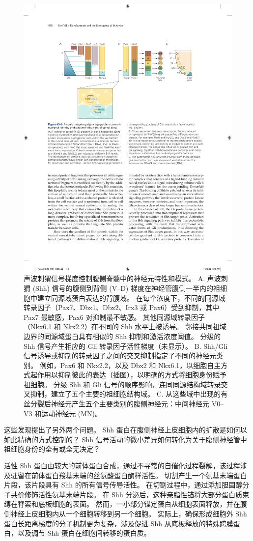 \begin{figure}[htbp]
	\centering
	\includegraphics[width=0.8\linewidth]{chap45/fig_45_9}
	\caption{声波刺猬信号梯度控制腹侧脊髓中的神经元特性和模式。 A. 声波刺猬 (Shh) 信号的腹侧到背侧 (V–D) 梯度在神经管腹侧一半内的祖细胞中建立同源域蛋白表达的背腹域。 在每个浓度下，不同的同源域转录因子（Pax7、Dbx1、Dbx2、Irx3 或 Pax6）受到抑制，其中 Pax7 最敏感，Pax6 对抑制最不敏感。 其他同源域转录因子（Nkx6.1 和 Nkx2.2）在不同的 Shh 水平上被诱导。 邻接共同祖域边界的同源域蛋白具有相似的 Shh 抑制和激活浓度阈值。 分级的 Shh 信号产生相应的 Gli 转录因子活性梯度（未显示）。 B. Shh/Gli 信号诱导或抑制的转录因子之间的交叉抑制指定了不同的神经元类别。 例如，Pax6 和 Nkx2.2，以及 Dbx2 和 Nkx6.1，以细胞自主方式起作用以抑制彼此的表达（插图），以明确的方式将细胞身份赋予祖细胞。 分级 Shh 和 Gli 信号的顺序影响，连同同源结构域转录交叉抑制，建立了五个主要的祖细胞结构域。 C. 从这些域中出现的有丝分裂后神经元产生五个主要类别的腹侧神经元：中间神经元 V0–V3 和运动神经元 (MN)。}
	\label{fig:45_9}
\end{figure}


这些发现提出了另外两个问题。
Shh 蛋白在腹侧神经上皮细胞内的扩散是如何以如此精确的方式控制的？
Shh 信号活动的微小差异如何转化为关于腹侧神经管中祖细胞身份的全有或全无决定？


活性 Shh 蛋白由较大的前体蛋白合成，通过不寻常的自催化过程裂解，该过程涉及驻留在前体蛋白羧基末端的丝氨酸蛋白酶样活性。
切割产生一个氨基末端蛋白片段，该片段具有 Shh 的所有信号传导活性。
在切割过程中，通过添加胆固醇分子共价修饰活性氨基末端片段。
在 Shh 分泌后，这种亲脂性锚将大部分蛋白质束缚在脊索和底板细胞的表面。
然而，一小部分锚定蛋白从细胞表面释放，并在腹侧神经上皮细胞内从一个细胞转移到另一个细胞。
实际上，确保形成细胞外 Shh 蛋白长距离梯度的分子机制更为复杂，涉及促进 Shh 从底板释放的特殊跨膜蛋白，以及调节 Shh 蛋白在细胞间转移的蛋白质。


